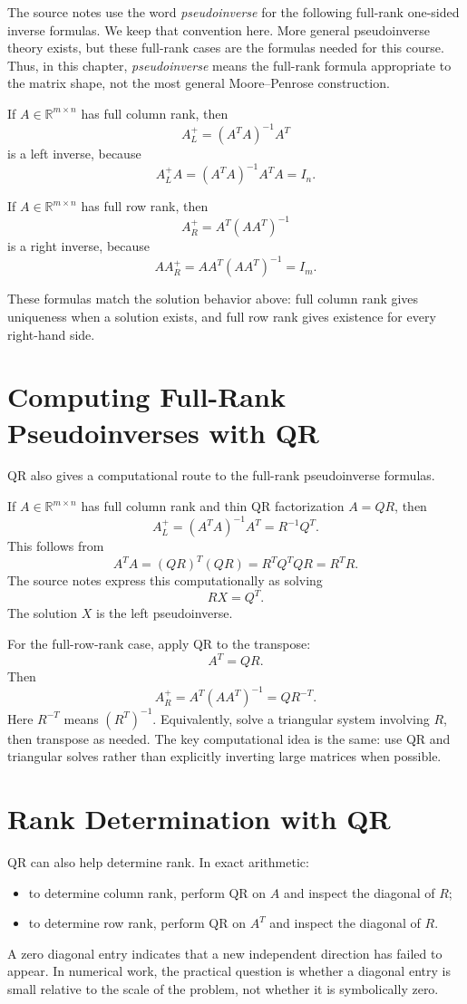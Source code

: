 The source notes use the word \emph{pseudoinverse} for the following full-rank one-sided inverse formulas. We keep that convention here. More general pseudoinverse theory exists, but these full-rank cases are the formulas needed for this course. Thus, in this chapter, \emph{pseudoinverse} means the full-rank formula appropriate to the matrix shape, not the most general Moore--Penrose construction.

If \(A\in\mathbb{R}^{m\times n}\) has full column rank, then
\[
    A^+_L=(A^TA)^{-1}A^T
\]
is a left inverse, because
\[
    A^+_L A=(A^TA)^{-1}A^TA=I_n.
\]

If \(A\in\mathbb{R}^{m\times n}\) has full row rank, then
\[
    A^+_R=A^T(AA^T)^{-1}
\]
is a right inverse, because
\[
    AA^+_R=AA^T(AA^T)^{-1}=I_m.
\]

These formulas match the solution behavior above: full column rank gives uniqueness when a solution exists, and full row rank gives existence for every right-hand side.

\section{Computing Full-Rank Pseudoinverses with QR}
\label{mf:qr-pseudoinverse}
\label{mf:qr-pseudoinverse-computation}

QR also gives a computational route to the full-rank pseudoinverse formulas.

If \(A\in\mathbb{R}^{m\times n}\) has full column rank and thin QR factorization \(A=QR\), then
\[
    A^+_L=(A^TA)^{-1}A^T=R^{-1}Q^T.
\]
This follows from
\[
    A^TA=(QR)^T(QR)=R^TQ^TQR=R^TR.
\]
The source notes express this computationally as solving
\[
    RX=Q^T.
\]
The solution \(X\) is the left pseudoinverse.

For the full-row-rank case, apply QR to the transpose:
\[
    A^T=QR.
\]
Then
\[
    A^+_R=A^T(AA^T)^{-1}=QR^{-T}.
\]
Here \(R^{-T}\) means \((R^T)^{-1}\).
Equivalently, solve a triangular system involving \(R\), then transpose as needed. The key computational idea is the same: use QR and triangular solves rather than explicitly inverting large matrices when possible.

\section{Rank Determination with QR}
\label{mf:rank-determination-qr}

QR can also help determine rank. In exact arithmetic:
\begin{itemize}
    \item to determine column rank, perform QR on \(A\) and inspect the diagonal of \(R\);
    \item to determine row rank, perform QR on \(A^T\) and inspect the diagonal of \(R\).
\end{itemize}
A zero diagonal entry indicates that a new independent direction has failed to appear. In numerical work, the practical question is whether a diagonal entry is small relative to the scale of the problem, not whether it is symbolically zero.

